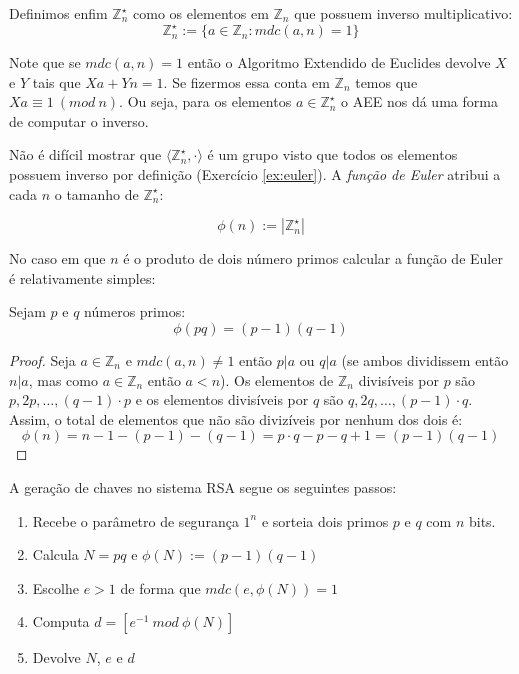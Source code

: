 Definimos enfim $\mathbb{Z}_n^\star$ como os elementos em $\mathbb{Z}_n$ que possuem inverso multiplicativo:
\begin{displaymath}
  \mathbb{Z}_n^\star := \{a \in \mathbb{Z}_n : mdc(a,n) = 1\}
\end{displaymath}

Note que se $mdc(a,n) = 1$ então o Algoritmo Extendido de Euclides devolve $X$ e $Y$ tais que $Xa + Yn = 1$.
Se fizermos essa conta em $\mathbb{Z}_n$ temos que $Xa \equiv 1\ (mod\ n)$.
Ou seja, para os elementos $a \in \mathbb{Z}_n^\star$ o AEE nos dá uma forma de computar o inverso.
 
Não é difícil mostrar que $\langle \mathbb{Z}_n^\star, \cdot \rangle$ é um grupo visto que todos os elementos possuem inverso por definição (Exercício \ref{ex:euler}).
A {\em função de Euler} atribui a cada $n$ o tamanho de $\mathbb{Z}_n^\star$:

\begin{displaymath}
  \phi(n) := |\mathbb{Z}_n^\star|
\end{displaymath}

No caso em que $n$ é o produto de dois número primos calcular a função de Euler é relativamente simples:

\begin{proposition}
Sejam $p$ e $q$ números primos:  
\begin{displaymath}
  \phi(pq) = (p - 1)(q - 1)
\end{displaymath}
\end{proposition}
\begin{proof}
Seja $a \in \mathbb{Z}_n$ e $mdc(a, n) \neq 1$ então $p|a$ ou $q|a$ (se ambos dividissem então $n|a$, mas como $a \in \mathbb{Z}_n$ então $a < n$).
Os elementos de $\mathbb{Z}_n$ divisíveis por $p$ são $p, 2p, \dots , (q - 1) \cdot p$ e os elementos divisíveis por $q$ são $q, 2q, \dots , (p - 1) \cdot q$. 
Assim, o total de elementos que não são divizíveis por nenhum dos dois é:
\begin{displaymath}
  \phi(n) = n - 1 - (p - 1) - (q - 1) = p \cdot q - p - q + 1 = (p - 1)(q - 1)
\end{displaymath}


\end{proof}

A geração de chaves no sistema RSA segue os seguintes passos:
\begin{enumerate}
\item Recebe o parâmetro de segurança $1^n$ e sorteia dois primos $p$ e $q$ com $n$ bits.
\item Calcula $N = pq$ e $\phi(N) := (p - 1)(q - 1)$
\item Escolhe $e > 1$ de forma que $mdc(e, \phi(N)) = 1$
\item Computa $d = [e^{-1}\ mod\ \phi(N)]$
\item Devolve $N$, $e$ e $d$ 
\end{enumerate}

